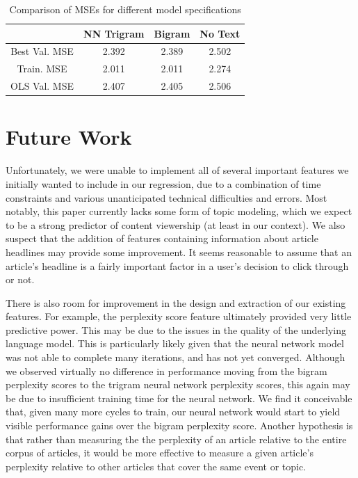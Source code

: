 \documentclass[fleqn,12pt]{SelfArx} %
\begin{document}
\begin{table}[hbt]
\caption{Comparison of MSEs for different model specifications}
\centering
\begin{tabular}{cccc}
\toprule
  & NN Trigram & Bigram & No Text\\
\midrule
Best Val. MSE & 2.392 & 2.389 &  2.502 \\
Train. MSE & 2.011 & 2.011 &  2.274 \\
OLS Val. MSE & 2.407 & 2.405 & 2.506 \\ 
\bottomrule
\end{tabular}
\end{table}

\section{Future Work}
Unfortunately, we were unable to implement all of several important features we initially wanted to include in our regression, due to a combination of time constraints and various unanticipated technical difficulties and errors. Most notably, this paper currently lacks some form of topic modeling, which we expect to be a strong predictor of content viewership (at least in our context). We also suspect that the addition of features containing information about article headlines may provide some improvement. It seems reasonable to assume that an article's headline is a fairly important factor in a user's decision to click through or not.

There is also room for improvement in the design and extraction of our existing features. For example, the perplexity score feature ultimately provided very little predictive power. This may be due to the issues in the quality of the underlying language model. This is particularly likely given that the neural network model was not able to complete many iterations, and has not yet converged. Although we observed virtually no difference in performance moving from the bigram perplexity scores to the trigram neural network perplexity scores, this again may be due to insufficient training time for the neural network. We find it conceivable that, given many more cycles to train, our neural network would start to yield visible performance gains over the bigram perplexity score. Another hypothesis is that rather than measuring the the perplexity of an article relative to the entire corpus of articles, it would be more effective to measure a given article's perplexity relative to other articles that cover the same event or topic. 
\end{document}
